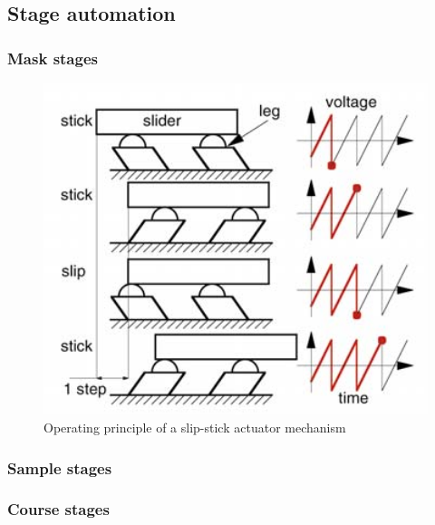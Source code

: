\documentclass[10pt]{article}
\begin{document}
\subsection{Stage automation}

\subsubsection{Mask stages}

\begin{figure}[H]
  \centering
  \begin{minipage}[b]{0.45\textwidth}
  \end{minipage}
  \hfill
  \begin{minipage}[b]{0.45\textwidth}
    \includegraphics[width=1\textwidth]{img/sample_holder_and_mask/Stick-slip-piezo-actuator-operation-principle.png}
    \caption{Operating principle of a slip-stick actuator mechanism 
    \cite{mazerollePositioningHandlingMeasuring2003}}
    \label{fig:slip_stick_principle}
  \end{minipage}
\end{figure}

\subsubsection{Sample stages}

\subsubsection{Course stages}
\end{document}
